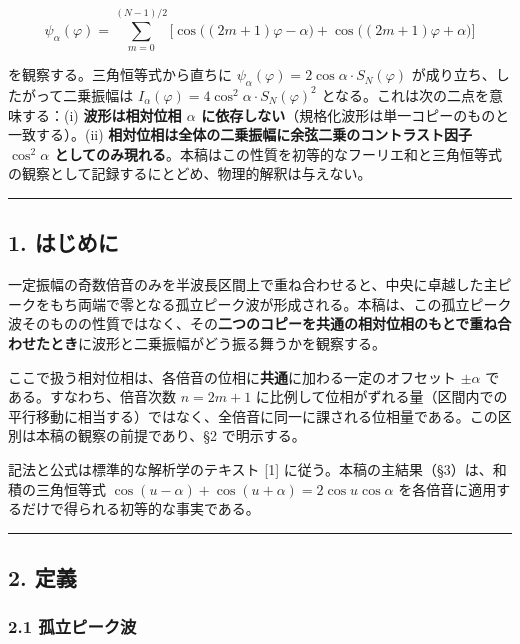 \documentclass[
]{ltjsarticle}
\begin{document}
\[
\psi_\alpha(\varphi)=\sum_{m=0}^{(N-1)/2}\Big[\cos\!\big((2m+1)\varphi-\alpha\big)+\cos\!\big((2m+1)\varphi+\alpha\big)\Big]
\]

を観察する。三角恒等式から直ちに
\(\psi_\alpha(\varphi)=2\cos\alpha\cdot S_N(\varphi)\)
が成り立ち、したがって二乗振幅は
\(I_\alpha(\varphi)=4\cos^2\!\alpha\cdot S_N(\varphi)^2\)
となる。これは次の二点を意味する：(i) \textbf{波形は相対位相 \(\alpha\)
に依存しない}（規格化波形は単一コピーのものと一致する）。(ii)
\textbf{相対位相は全体の二乗振幅に余弦二乗のコントラスト因子
\(\cos^2\!\alpha\)
としてのみ現れる}。本稿はこの性質を初等的なフーリエ和と三角恒等式の観察として記録するにとどめ、物理的解釈は与えない。

\begin{center}\rule{0.5\linewidth}{0.5pt}\end{center}

\subsection{1. はじめに}\label{ux306fux3058ux3081ux306b}

一定振幅の奇数倍音のみを半波長区間上で重ね合わせると、中央に卓越した主ピークをもち両端で零となる孤立ピーク波が形成される。本稿は、この孤立ピーク波そのものの性質ではなく、その\textbf{二つのコピーを共通の相対位相のもとで重ね合わせたとき}に波形と二乗振幅がどう振る舞うかを観察する。

ここで扱う相対位相は、各倍音の位相に\textbf{共通}に加わる一定のオフセット
\(\pm\alpha\) である。すなわち、倍音次数 \(n=2m+1\)
に比例して位相がずれる量（区間内での平行移動に相当する）ではなく、全倍音に同一に課される位相量である。この区別は本稿の観察の前提であり、§2
で明示する。

記法と公式は標準的な解析学のテキスト {[}1{]}
に従う。本稿の主結果（§3）は、和積の三角恒等式
\(\cos(u-\alpha)+\cos(u+\alpha)=2\cos u\cos\alpha\)
を各倍音に適用するだけで得られる初等的な事実である。

\begin{center}\rule{0.5\linewidth}{0.5pt}\end{center}

\subsection{2. 定義}\label{ux5b9aux7fa9}

\subsubsection{2.1
孤立ピーク波}\label{ux5b64ux7acbux30d4ux30fcux30afux6ce2}
\end{document}
